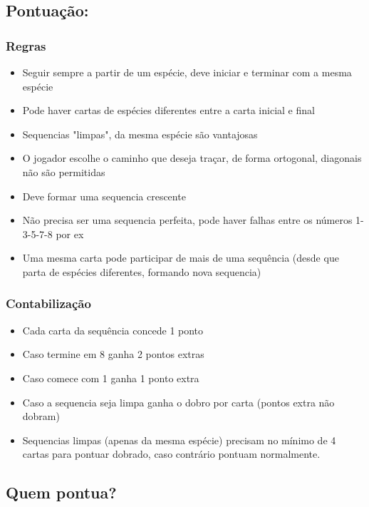 \documentclass[11pt]{article}
\begin{document}
\subsection{Pontuação:}
\label{sec:orgbc977ae}

\subsubsection{Regras}
\label{sec:orge7e279a}

\begin{itemize}
\item Seguir sempre a partir de um espécie, deve iniciar e terminar com a mesma espécie
\item Pode haver cartas de espécies diferentes entre a carta inicial e final
\item Sequencias "limpas", da mesma espécie são vantajosas
\item O jogador escolhe o caminho que deseja traçar, de forma ortogonal, diagonais não são permitidas
\item Deve formar uma sequencia crescente
\item Não precisa ser uma sequencia perfeita, pode haver falhas entre os números 1-3-5-7-8 por ex
\item Uma mesma carta pode participar de mais de uma sequência (desde que parta de espécies diferentes, formando nova sequencia)
\end{itemize}

\subsubsection{Contabilização}
\label{sec:orgf2062e2}

\begin{itemize}
\item Cada carta da sequência concede 1 ponto
\item Caso termine em 8 ganha 2 pontos extras
\item Caso comece com 1 ganha 1 ponto extra
\item Caso a sequencia seja limpa ganha o dobro por carta (pontos extra não dobram)
\item Sequencias limpas (apenas da mesma espécie) precisam no mínimo de 4 cartas para pontuar dobrado, caso contrário pontuam normalmente.
\end{itemize}


\subsection{Quem pontua?}
\label{sec:orge06f11f}
\end{document}
